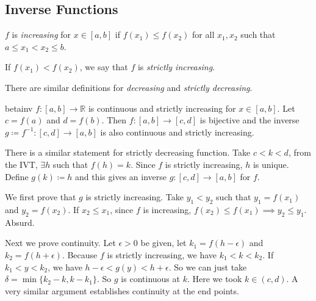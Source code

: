 \subsection{Inverse Functions}
\leavevmode
\begin{definition}{}{}
    \(f\) is \textit{increasing} for \(x \in [a,b]\) if \(f(x_1) \leq f(x_2)\) for all \(x_1, x_2\) such that \(a\leq x_1 < x_2 \leq b\).

    If \(f(x_1) < f(x_2)\), we say that \(f\) is \textit{strictly increasing}.

    There are similar definitions for \textit{decreasing} and \textit{strictly decreasing}.
\end{definition}
\begin{theorem}{}{betainv}
    \(f: [a,b] \to \mathbb{R}\) is continuous and strictly increasing for \(x \in [a,b]\). Let \( c = f(a)\) and \(d = f(b)\). Then \(f: [a,b] \to [c,d]\) is bijective and the inverse \(g\coloneqq f^{-1}:[c,d] \to [a,b]\) is also continuous and strictly increasing.
\end{theorem}
\begin{remark}
    There is a similar statement for strictly decreasing function. Take \(c < k < d\), from the IVT, \(\exists h \) such that \(f(h) = k\). Since \(f\) is strictly increasing, \(h\) is unique. Define \(g(k) \coloneqq h\) and this gives an inverse \(g: [c,d] \to [a,b]\) for \(f\).

    We first prove that \(g\) is strictly increasing. Take \(y_1 < y_2\) such that \(y_1 = f(x_1)\) and \(y_2 = f(x_2)\). If \(x_2 \leq x_1\), since \(f\) is increasing, \(f(x_2) \leq  f(x_1) \implies y_2 \leq y_1\). Absurd.

    Next we prove continuity. Let \(\epsilon >0\) be given, let \(k_1 = f(h - \epsilon)\) and \(k_2 = f(h + \epsilon)\). Because \(f\) is strictly increasing, we have \( k_1 < k < k_2\). If \(k_1 < y<k_2\), we have \(h-\epsilon<g(y) < h + \epsilon\). So we can just take \(\delta=\min\{k_2 - k, k-k_1\}\). So \(g\) is continuous at \(k\). Here we took \(k \in (c,d)\). A very similar argument establishes continuity at the end points.
\end{remark}